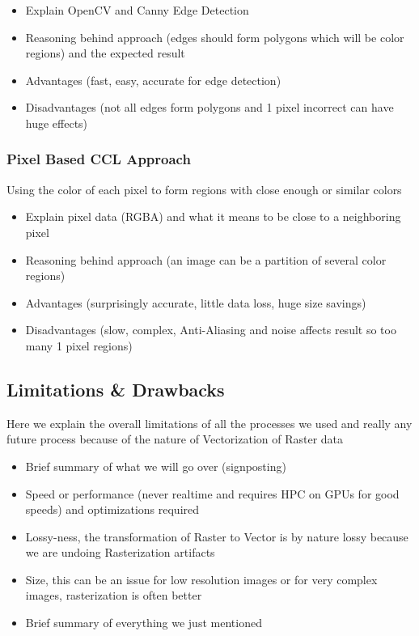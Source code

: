 \documentclass[12pt]{article}
\begin{document}
    \begin{itemize}
        \item Explain OpenCV and Canny Edge Detection
        \item Reasoning behind approach (edges should form polygons which will be color regions) and the expected result
        \item Advantages (fast, easy, accurate for edge detection)
        \item Disadvantages (not all edges form polygons and 1 pixel incorrect can have huge effects)
    \end{itemize}

    \subsubsection{Pixel Based CCL Approach}

    Using the color of each pixel to form regions with close enough or similar colors

    \begin{itemize}
        \item Explain pixel data (RGBA) and what it means to be close to a neighboring pixel
        \item Reasoning behind approach (an image can be a partition of several color regions)
        \item Advantages (surprisingly accurate, little data loss, huge size savings)
        \item Disadvantages (slow, complex, Anti-Aliasing and noise affects result so too many 1 pixel regions)
    \end{itemize}

    \subsection{Limitations \& Drawbacks}

    Here we explain the overall limitations of all the processes we used and really any future process because
    of the nature of Vectorization of Raster data

    \begin{itemize}
        \item Brief summary of what we will go over (signposting)
        \item Speed or performance (never realtime and requires HPC on GPUs for good speeds) and optimizations required
        \item Lossy-ness, the transformation of Raster to Vector is by nature lossy because we are undoing Rasterization
        artifacts
        \item Size, this can be an issue for low resolution images or for very complex images, rasterization is often better
        \item Brief summary of everything we just mentioned
    \end{itemize}
\end{document}
